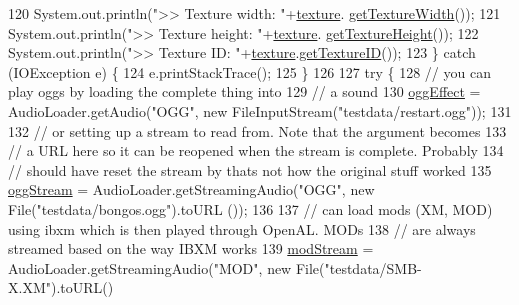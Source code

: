 \begin{DoxyCode}
120             System.out.println(\textcolor{stringliteral}{">> Texture width: "}+\mbox{\hyperlink{classorg_1_1newdawn_1_1slick_1_1tests_1_1_test_utils_afc788f996bdde4e06aba401024783347}{texture}}.
      \mbox{\hyperlink{interfaceorg_1_1newdawn_1_1slick_1_1opengl_1_1_texture_aa85f8503feafc2f18472a4deb2a67b4e}{getTextureWidth}}());
121             System.out.println(\textcolor{stringliteral}{">> Texture height: "}+\mbox{\hyperlink{classorg_1_1newdawn_1_1slick_1_1tests_1_1_test_utils_afc788f996bdde4e06aba401024783347}{texture}}.
      \mbox{\hyperlink{interfaceorg_1_1newdawn_1_1slick_1_1opengl_1_1_texture_a6626d0905e80214b320fb0042ad0e98d}{getTextureHeight}}());
122             System.out.println(\textcolor{stringliteral}{">> Texture ID: "}+\mbox{\hyperlink{classorg_1_1newdawn_1_1slick_1_1tests_1_1_test_utils_afc788f996bdde4e06aba401024783347}{texture}}.\mbox{\hyperlink{interfaceorg_1_1newdawn_1_1slick_1_1opengl_1_1_texture_a0d846c1cfcc66768db002d4eb06ad841}{getTextureID}}());
123         \} \textcolor{keywordflow}{catch} (IOException e) \{
124             e.printStackTrace();
125         \}
126 
127         \textcolor{keywordflow}{try} \{
128             \textcolor{comment}{// you can play oggs by loading the complete thing into }
129             \textcolor{comment}{// a sound}
130             \mbox{\hyperlink{classorg_1_1newdawn_1_1slick_1_1tests_1_1_test_utils_a4f17a6703add4a5d30e064fb32d69a34}{oggEffect}} = AudioLoader.getAudio(\textcolor{stringliteral}{"OGG"}, \textcolor{keyword}{new} FileInputStream(\textcolor{stringliteral}{"testdata/restart.ogg"}));
131             
132             \textcolor{comment}{// or setting up a stream to read from. Note that the argument becomes}
133             \textcolor{comment}{// a URL here so it can be reopened when the stream is complete. Probably}
134             \textcolor{comment}{// should have reset the stream by thats not how the original stuff worked}
135             \mbox{\hyperlink{classorg_1_1newdawn_1_1slick_1_1tests_1_1_test_utils_a7ea74d87f68b8c8b5e34936b51baf0b8}{oggStream}} = AudioLoader.getStreamingAudio(\textcolor{stringliteral}{"OGG"}, \textcolor{keyword}{new} File(\textcolor{stringliteral}{"testdata/bongos.ogg"}).toURL
      ());
136             
137             \textcolor{comment}{// can load mods (XM, MOD) using ibxm which is then played through OpenAL. MODs}
138             \textcolor{comment}{// are always streamed based on the way IBXM works}
139             \mbox{\hyperlink{classorg_1_1newdawn_1_1slick_1_1tests_1_1_test_utils_a976c40b2829c394a1bdead2aac1125a4}{modStream}} = AudioLoader.getStreamingAudio(\textcolor{stringliteral}{"MOD"}, \textcolor{keyword}{new} File(\textcolor{stringliteral}{"testdata/SMB-X.XM"}).toURL()

\end{DoxyCode}
